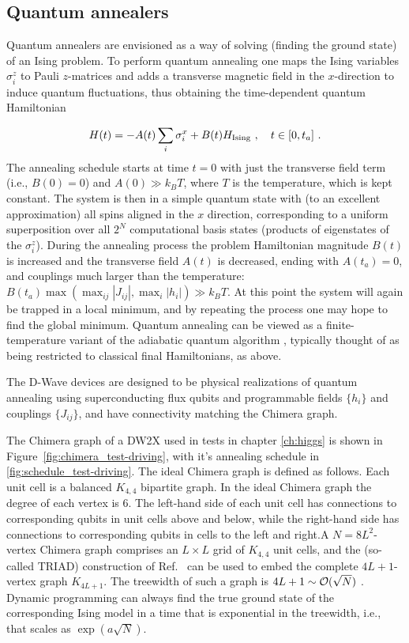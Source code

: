 \subsection{Quantum annealers}
Quantum annealers are envisioned as a way of solving (finding the ground state) of an Ising problem. To perform quantum annealing one maps the Ising variables $\sigma_i^z$ to Pauli $z$-matrices and adds a transverse magnetic field in the $x$-direction to induce quantum fluctuations, thus obtaining the time-dependent quantum Hamiltonian

\begin{equation}
\label{eq:Hquantum}
H(t) = -A(t) \sum_i \sigma_i^x +B(t) H_{\rm Ising}\ , \quad t\in[0,t_a]\ .
\end{equation}
The annealing schedule starts at time $t=0$ with just the transverse field term (i.e., $B(0)=0$) and $A(0)\gg k_B T$, where $T$ is the temperature, which is kept constant. The system is then in a simple quantum state with (to an excellent approximation) all spins aligned in the $x$ direction, corresponding to a uniform superposition over all $2^N$ computational basis states (products of eigenstates of the $\sigma_i^z$). During the annealing process the problem Hamiltonian magnitude $B(t)$ is increased and the transverse field $A(t)$ is decreased, ending with $A(t_a)=0$, and couplings much larger than the temperature: $B(t_a) \max(\max_{ij}|J_{ij}|,\max_i|h_i|) \gg k_BT$.
At this point the system will again be trapped in a local minimum, and by repeating the process one may hope to find the global minimum. Quantum annealing can be viewed as a finite-temperature variant of the adiabatic quantum algorithm \cite{farhi}, typically thought of as being restricted to classical final Hamiltonians, as above.

The D-Wave devices \cite{Harris2010,0953-2048-23-6-065004,berkley2010scalable,Johnson2011} are designed to be physical realizations of quantum annealing using superconducting flux qubits and programmable fields $\{h_i\}$ and couplings $\{J_{ij}\}$, and have connectivity matching the Chimera graph.

 The Chimera graph of a DW2X used in tests in chapter \ref{ch:higgs} is shown in Figure~\ref{fig:chimera_test-driving}, with it's annealing schedule in \ref{fig:schedule_test-driving}. The ideal Chimera graph is defined as follows. Each unit cell is a balanced $K_{4,4}$ bipartite graph. In the ideal Chimera graph the degree of each vertex is $6$. The left-hand side of each unit cell has connections to corresponding qubits in unit cells above and below, while the right-hand side has connections to corresponding qubits in cells to the left and right.A $N=8L^2$-vertex Chimera graph comprises an $L\times L$ grid of $K_{4,4}$ unit cells, and the (so-called {\sc TRIAD}) construction of Ref.~\cite{Choi2} can be used to embed the complete $4L+1$-vertex graph $K_{4L+1}$.
 The treewidth of such a graph is $4L+1 \sim \mathcal{O}(\sqrt{N})$ \cite{Choi2}. Dynamic programming can always find the true ground state of the corresponding Ising model in a time that is exponential in the treewidth, i.e., that scales as $\exp(a\sqrt{N})$.


